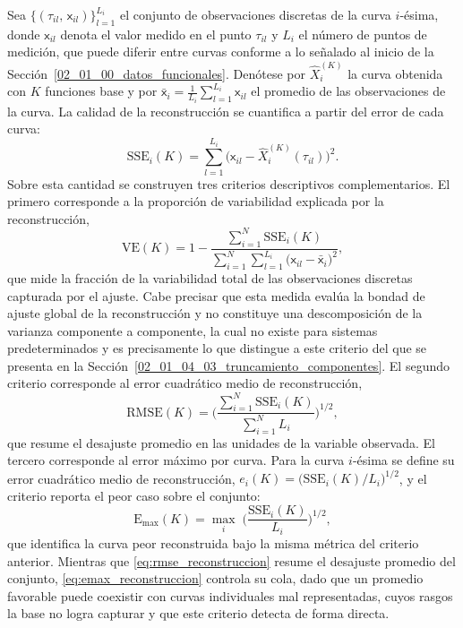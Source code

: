 Sea $\{(\tau_{il},\, \mathsf{x}_{il})\}_{l=1}^{L_i}$ el conjunto de observaciones discretas de la curva $i$-ésima, donde $\mathsf{x}_{il}$ denota el valor medido en el punto $\tau_{il}$ y $L_i$ el número de puntos de medición, que puede diferir entre curvas conforme a lo señalado al inicio de la Sección~\ref{02_01_00_datos_funcionales}. Denótese por $\hat{X}_i^{(K)}$ la curva obtenida con $K$ funciones base y por $\bar{\mathsf{x}}_i = \frac{1}{L_i}\sum_{l=1}^{L_i} \mathsf{x}_{il}$ el promedio de las observaciones de la curva. La calidad de la reconstrucción se cuantifica a partir del error de cada curva:
\begin{equation}\label{eq:sse_curva}
    \mathrm{SSE}_i(K) = \sum_{l=1}^{L_i}
    \bigl(\mathsf{x}_{il} - \hat{X}_i^{(K)}(\tau_{il})\bigr)^2.
\end{equation}
Sobre esta cantidad se construyen tres criterios descriptivos complementarios. El primero corresponde a la proporción de variabilidad explicada por la reconstrucción,
\begin{equation}\label{eq:ve_reconstruccion}
    \mathrm{VE}(K) = 1 -
    \frac{\sum_{i=1}^{N}\mathrm{SSE}_i(K)}
    {\sum_{i=1}^{N}\sum_{l=1}^{L_i}\bigl(\mathsf{x}_{il} - \bar{\mathsf{x}}_i\bigr)^2},
\end{equation}
que mide la fracción de la variabilidad total de las observaciones discretas capturada por el ajuste. Cabe precisar que esta medida evalúa la bondad de ajuste global de la reconstrucción y no constituye una descomposición de la varianza componente a componente, la cual no existe para sistemas predeterminados y es precisamente lo que distingue a este criterio del que se presenta en la Sección~\ref{02_01_04_03_truncamiento_componentes}. El segundo criterio corresponde al error cuadrático medio de reconstrucción,
\begin{equation}\label{eq:rmse_reconstruccion}
    \mathrm{RMSE}(K) = \Biggl(
    \frac{\sum_{i=1}^{N}\mathrm{SSE}_i(K)}
    {\sum_{i=1}^{N} L_i}
    \Biggr)^{1/2},
\end{equation}
que resume el desajuste promedio en las unidades de la variable observada. El tercero corresponde al error máximo por curva. Para la curva $i$-ésima se define su error cuadrático medio de reconstrucción, $e_i(K) = \bigl(\mathrm{SSE}_i(K)/L_i\bigr)^{1/2}$, y el criterio reporta el peor caso sobre el conjunto:
\begin{equation}\label{eq:emax_reconstruccion}
    \mathrm{E}_{\max}(K) = \max_{i}\;
    \Biggl(\frac{\mathrm{SSE}_i(K)}{L_i}\Biggr)^{1/2},
\end{equation}
que identifica la curva peor reconstruida bajo la misma métrica del criterio anterior. Mientras que \eqref{eq:rmse_reconstruccion} resume el desajuste promedio del conjunto, \eqref{eq:emax_reconstruccion} controla su cola, dado que un promedio favorable puede coexistir con curvas individuales mal representadas, cuyos rasgos la base no logra capturar y que este criterio detecta de forma directa.\\

